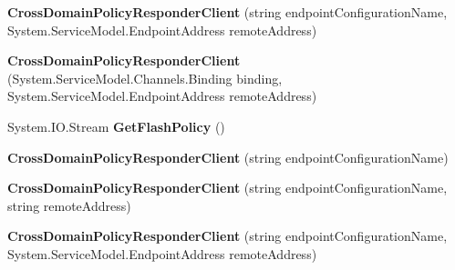 \begin{DoxyCompactItemize}
\item 
\hypertarget{class_tripi_w_c_f_1_1_client_mockup_1_1_proxy_1_1_cross_domain_policy_responder_client_a8c20d5420735a3405736fc8f579a6f59}{
{\bfseries CrossDomainPolicyResponderClient} (string endpointConfigurationName, System.ServiceModel.EndpointAddress remoteAddress)}
\label{class_tripi_w_c_f_1_1_client_mockup_1_1_proxy_1_1_cross_domain_policy_responder_client_a8c20d5420735a3405736fc8f579a6f59}

\item 
\hypertarget{class_tripi_w_c_f_1_1_client_mockup_1_1_proxy_1_1_cross_domain_policy_responder_client_a25830c515ea9a9a917bdbfb0f93fe948}{
{\bfseries CrossDomainPolicyResponderClient} (System.ServiceModel.Channels.Binding binding, System.ServiceModel.EndpointAddress remoteAddress)}
\label{class_tripi_w_c_f_1_1_client_mockup_1_1_proxy_1_1_cross_domain_policy_responder_client_a25830c515ea9a9a917bdbfb0f93fe948}

\item 
\hypertarget{class_tripi_w_c_f_1_1_client_mockup_1_1_proxy_1_1_cross_domain_policy_responder_client_a0246400572a505db33fd2489f6d879af}{
System.IO.Stream {\bfseries GetFlashPolicy} ()}
\label{class_tripi_w_c_f_1_1_client_mockup_1_1_proxy_1_1_cross_domain_policy_responder_client_a0246400572a505db33fd2489f6d879af}

\item 
\hypertarget{class_tripi_w_c_f_1_1_client_mockup_1_1_proxy_1_1_cross_domain_policy_responder_client_a1c3e714c69ed57a59bdb3b75795580af}{
{\bfseries CrossDomainPolicyResponderClient} (string endpointConfigurationName)}
\label{class_tripi_w_c_f_1_1_client_mockup_1_1_proxy_1_1_cross_domain_policy_responder_client_a1c3e714c69ed57a59bdb3b75795580af}

\item 
\hypertarget{class_tripi_w_c_f_1_1_client_mockup_1_1_proxy_1_1_cross_domain_policy_responder_client_a2ff9ef3fbb572c6ed3b4f1fd0c9647f6}{
{\bfseries CrossDomainPolicyResponderClient} (string endpointConfigurationName, string remoteAddress)}
\label{class_tripi_w_c_f_1_1_client_mockup_1_1_proxy_1_1_cross_domain_policy_responder_client_a2ff9ef3fbb572c6ed3b4f1fd0c9647f6}

\item 
\hypertarget{class_tripi_w_c_f_1_1_client_mockup_1_1_proxy_1_1_cross_domain_policy_responder_client_a8c20d5420735a3405736fc8f579a6f59}{
{\bfseries CrossDomainPolicyResponderClient} (string endpointConfigurationName, System.ServiceModel.EndpointAddress remoteAddress)}
\label{class_tripi_w_c_f_1_1_client_mockup_1_1_proxy_1_1_cross_domain_policy_responder_client_a8c20d5420735a3405736fc8f579a6f59}


\end{DoxyCompactItemize}
